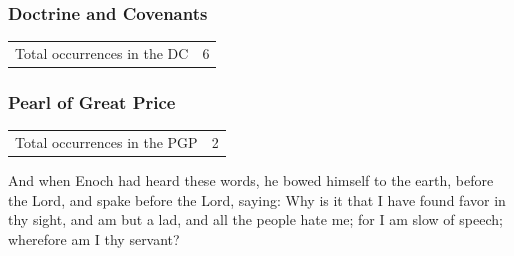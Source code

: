 	\subsubsection{Doctrine and Covenants} %
		\label{FAVOR-DC}
	
		\begin{tabular}{ll}
			Total occurrences in the DC & 6
		\end{tabular}
		
		\begin{compactdesc}
			\item[]
		\end{compactdesc}
		
	\subsubsection{Pearl of Great Price} %
		\label{FAVOR-PGP}
	
		\begin{tabular}{ll}
			Total occurrences in the PGP & 2
		\end{tabular}
		
		\begin{compactdesc}
			\item[Moses 6:31] And when Enoch had heard these words, he bowed himself to the earth, before the Lord, and spake before the Lord, saying: Why is it that I have found favor in thy sight, and am but a lad, and all the people hate me; for I am slow of speech; wherefore am I thy servant?
			\item[JS-H Note 2]
		\end{compactdesc}
		

	

